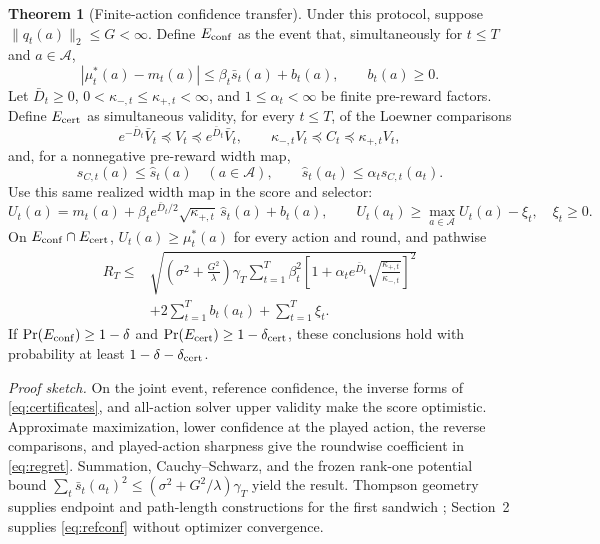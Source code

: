 \documentclass[10pt]{article}
\theoremstyle{definition}
\newtheorem{theorem}{Theorem}
\newcommand{\Vbar}{\bar V}
\newcommand{\Dbar}{\bar D}
\newcommand{\shat}{\widehat s}
\begin{document}
\begin{theorem}[Finite-action confidence transfer]\label{thm:transfer}
Under this protocol, suppose $\|q_t(a)\|_2\le G<\infty$.
Define $E_{\rm conf}$ as the event that, simultaneously for
$t\le T$ and $a\in\mathcal A$,
\begin{equation}
|\mu_t^*(a)-m_t(a)|
\le\beta_t\bar s_t(a)+b_t(a),\qquad b_t(a)\ge0.
\label{eq:refconf}
\end{equation}
Let $\Dbar_t\ge0$,
$0<\kappa_{-,t}\le\kappa_{+,t}<\infty$, and
$1\le\alpha_t<\infty$ be finite pre-reward factors.
Define $E_{\rm cert}$ as simultaneous validity, for every $t\le T$,
of the Loewner comparisons
\begin{equation}
e^{-\Dbar_t}\Vbar_t\preceq V_t\preceq e^{\Dbar_t}\Vbar_t,\qquad
\kappa_{-,t}V_t\preceq C_t\preceq\kappa_{+,t}V_t,
\label{eq:certificates}
\end{equation}
and, for a nonnegative pre-reward width map,
\begin{equation}
s_{C,t}(a)\le\shat_t(a)\quad(a\in\mathcal A),\qquad
\shat_t(a_t)\le\alpha_t s_{C,t}(a_t).
\label{eq:solver}
\end{equation}
Use this same realized width map in the score and selector:
\begin{equation}
U_t(a)=m_t(a)+\beta_t e^{\Dbar_t/2}
\sqrt{\kappa_{+,t}}\,\shat_t(a)+b_t(a),\qquad
U_t(a_t)\ge\max_{a\in\mathcal A}U_t(a)-\xi_t,\quad\xi_t\ge0.
\label{eq:score}
\end{equation}
On $E_{\rm conf}\cap E_{\rm cert}$,
$U_t(a)\ge\mu_t^*(a)$ for every action and round, and pathwise
\begin{equation}
\begin{aligned}
R_T\le{}&
\sqrt{\left(\sigma^2+\frac{G^2}{\lambda}\right)\gamma_T
\sum_{t=1}^T\beta_t^2
\left[1+\alpha_t e^{\Dbar_t}
\sqrt{\frac{\kappa_{+,t}}{\kappa_{-,t}}}\right]^2}\\
&+2\sum_{t=1}^T b_t(a_t)+\sum_{t=1}^T\xi_t.
\end{aligned}
\label{eq:regret}
\end{equation}
If $\Pr(E_{\rm conf})\ge1-\delta$ and
$\Pr(E_{\rm cert})\ge1-\delta_{\rm cert}$, these conclusions hold
with probability at least $1-\delta-\delta_{\rm cert}$.
\end{theorem}
\emph{Proof sketch.} On the joint event, reference confidence, the inverse
forms of \eqref{eq:certificates}, and all-action solver upper validity make
the score optimistic. Approximate maximization, lower confidence at the played
action, the reverse comparisons, and played-action sharpness give the
roundwise coefficient in \eqref{eq:regret}. Summation, Cauchy--Schwarz,
and the frozen rank-one potential bound
$\sum_t\bar s_t(a_t)^2\le(\sigma^2+G^2/\lambda)\gamma_T$
yield the result. Thompson geometry supplies endpoint and path-length
constructions for the first sandwich \cite{nussbaum1994finsler}; Section~2
supplies \eqref{eq:refconf} without optimizer convergence.
\end{document}
